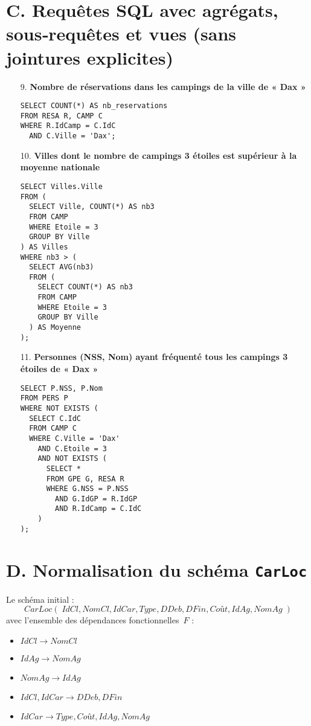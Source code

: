\documentclass[a4paper,11pt]{article}
\begin{document}
\section*{C. Requêtes SQL avec agrégats, sous‐requêtes et vues (sans jointures explicites)}
\begin{enumerate}
  \item[9.] \textbf{Nombre de réservations dans les campings de la ville de « Dax »}\\
    \begin{verbatim}
SELECT COUNT(*) AS nb_reservations
FROM RESA R, CAMP C
WHERE R.IdCamp = C.IdC
  AND C.Ville = 'Dax';
    \end{verbatim}
  \item[10.] \textbf{Villes dont le nombre de campings 3 étoiles est supérieur à la moyenne nationale}\\
    \begin{verbatim}
SELECT Villes.Ville
FROM (
  SELECT Ville, COUNT(*) AS nb3
  FROM CAMP
  WHERE Etoile = 3
  GROUP BY Ville
) AS Villes
WHERE nb3 > (
  SELECT AVG(nb3)
  FROM (
    SELECT COUNT(*) AS nb3
    FROM CAMP
    WHERE Etoile = 3
    GROUP BY Ville
  ) AS Moyenne
);
    \end{verbatim}
  \item[11.] \textbf{Personnes (NSS, Nom) ayant fréquenté tous les campings 3 étoiles de « Dax »}\\
    \begin{verbatim}
SELECT P.NSS, P.Nom
FROM PERS P
WHERE NOT EXISTS (
  SELECT C.IdC
  FROM CAMP C
  WHERE C.Ville = 'Dax'
    AND C.Etoile = 3
    AND NOT EXISTS (
      SELECT *
      FROM GPE G, RESA R
      WHERE G.NSS = P.NSS
        AND G.IdGP = R.IdGP
        AND R.IdCamp = C.IdC
    )
);
    \end{verbatim}
\end{enumerate}

\section*{D. Normalisation du schéma \texttt{CarLoc}}  
Le schéma initial :
\[CarLoc(\;IdCl, NomCl, IdCar, Type, DDeb, DFin, Coût, IdAg, NomAg\;)\]
avec l'ensemble des dépendances fonctionnelles~$F$ :
\begin{itemize}
  \item $IdCl \to NomCl$ 
  \item $IdAg \to NomAg$  
  \item $NomAg \to IdAg$  
  \item $IdCl,IdCar \to DDeb,DFin$  
  \item $IdCar \to Type,Coût,IdAg,NomAg$  
\end{itemize}
\end{document}

